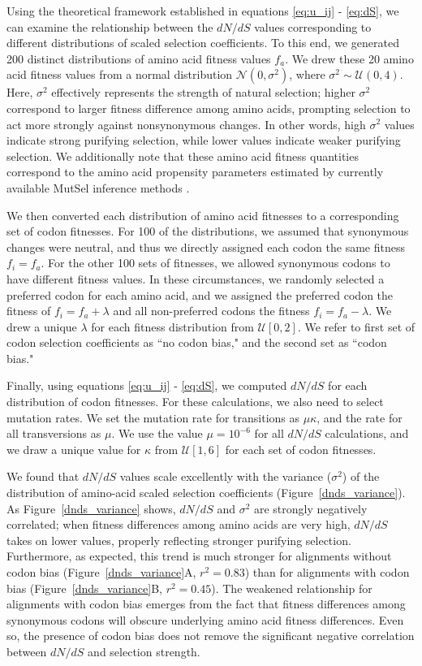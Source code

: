 \documentclass{pnastwo}
\begin{document}
\begin{article}
Using the theoretical framework established in equations \eqref{eq:u_ij} - \eqref{eq:dS}, we can examine the relationship between the $dN/dS$ values corresponding to different distributions of scaled selection coefficients. To this end, we generated 200 distinct distributions of amino acid fitness values $f_a$. We drew these 20 amino acid fitness values from a normal distribution $\mathcal{N}(0,\sigma^2)$, where $\sigma^2 \sim \mathcal{U}(0,4)$. Here, $\sigma^2$ effectively represents the strength of natural selection; higher $\sigma^2$ correspond to larger fitness difference among amino acids, prompting selection to act more strongly against nonsynonymous changes. In other words, high $\sigma^2$ values indicate strong purifying selection, while lower values indicate weaker purifying selection. We additionally note that these amino acid fitness quantities correspond to the amino acid propensity parameters estimated by currently available MutSel inference methods \cite{RodrigueLartillot2014,Tamurietal2014}.

We then converted each distribution of amino acid fitnesses to a corresponding set of codon fitnesses. For 100 of the distributions, we assumed that synonymous changes were neutral, and thus we directly assigned each codon the same fitness $f_i = f_a$. For the other 100 sets of fitnesses, we allowed synonymous codons to have different fitness values. In these circumstances, we randomly selected a preferred codon for each amino acid, and we assigned the preferred codon the fitness of $f_i = f_a + \lambda$ and all non-preferred codons the fitness $f_i = f_a - \lambda$. We drew a unique $\lambda$ for each fitness distribution from $\mathcal{U}[0,2]$. We refer to first set of codon selection coefficients as ``no codon bias," and the second set as ``codon bias." 

Finally, using equations \eqref{eq:u_ij} - \eqref{eq:dS}, we computed $dN/dS$ for each distribution of codon fitnesses. For these calculations, we also need to select mutation rates. We set the mutation rate for transitions as $\mu\kappa$, and the rate for all transversions as $\mu$. We use the value $\mu = 10^{-6}$ for all $dN/dS$ calculations, and we draw a unique value for $\kappa$ from $\mathcal{U}[1,6]$ for each set of codon fitnesses.

We found that $dN/dS$ values scale excellently with the variance ($\sigma^2$) of the distribution of amino-acid scaled selection coefficients (Figure~\ref{dnds_variance}). As Figure~\ref{dnds_variance} shows, $dN/dS$ and $\sigma^2$ are strongly negatively correlated; when fitness differences among amino acids are very high, $dN/dS$ takes on lower values, properly reflecting stronger purifying selection. Furthermore, as expected, this trend is much stronger for alignments without codon bias (Figure~\ref{dnds_variance}A, $r^2 = 0.83$) than for alignments with codon bias (Figure~\ref{dnds_variance}B, $r^2 = 0.45$). The weakened relationship for alignments with codon bias emerges from the fact that fitness differences among synonymous codons will obscure underlying amino acid fitness differences. Even so, the presence of codon bias does not remove the significant negative correlation between $dN/dS$ and selection strength.
		

\end{article}
\end{document}
